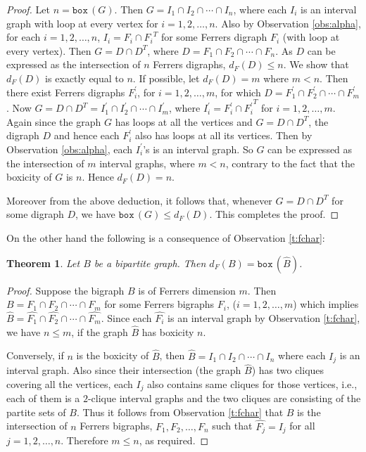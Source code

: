 \documentclass[11pt]{article}
\newtheorem{thm}{Theorem}[section]
\theoremstyle{definition}
\theoremstyle{remark}
\numberwithin{equation}{section}
\newcommand{\BOX}[1]{\texttt{box}\,(#1)}
\begin{document}
\begin{proof}Let $n=\BOX{G}$. Then $G = I_1 \cap I_2 \cap \cdots \cap I_n$, where each $I_i$ is an interval graph with loop at every vertex for $i = 1, 2, \ldots , n$. Also by Observation \ref{obs:alpha}, for each $i = 1, 2, \ldots, n$, $I_i = F_i \cap {F_i}^T$ for some Ferrers digraph $F_i$ (with loop at every vertex). Then $G=D\cap D^T$, where $D = F_1 \cap F_2 \cap \cdots \cap F_n$. As $D$ can be expressed as the intersection of $n$ Ferrers digraphs, $d_F(D) \leq n$. We show that $d_F(D)$ is exactly equal to $n$. If possible, let $d_F(D) = m$ where $m < n$. Then there exist Ferrers digraphs $F^\prime_i$, for $i = 1, 2, \ldots , m$, for which $D = F^\prime_1 \cap F^\prime_2 \cap \cdots \cap F^\prime_m$. Now $G=D \cap D^T={I^\prime_1} \cap {I^\prime_2} \cap \cdots \cap {I^\prime_m}$, where $I^\prime_i = {F^\prime_i} \cap {{F^\prime_i}^T}$ for $i = 1, 2, \ldots , m$. Again since the graph $G$ has loops at all the vertices and $G=D\cap D^T$, the digraph $D$ and hence each $F_i^\prime$ also has loops at all its vertices. Then by Observation \ref{obs:alpha}, each $I^\prime_i$'s is an interval graph. So $G$ can be expressed as the intersection of $m$ interval graphs, where $m < n$, contrary to the fact that the boxicity of $G$ is $n$. Hence $d_F(D) = n$.

\vspace{1em} Moreover from the above deduction, it follows that, whenever $G=D\cap D^T$ for some digraph $D$, we have $\BOX{G}\leqslant d_F(D)$. This completes the proof.
\end{proof}

On the other hand the following is a consequence of Observation \ref{t:fchar}:

\begin{thm}
Let $B$ be a bipartite graph. Then $d_F(B)=\BOX{\widehat{B}}$.
\end{thm}

\begin{proof}
Suppose the bigraph $B$ is of Ferrers dimension $m$. Then $B=F_1\cap F_2\cap\cdots \cap F_m$ for some Ferrers bigraphs $F_i$, {\small ($i=1,2,\ldots ,m$)} which implies $\widehat{B}=\widehat{F_1}\cap \widehat{F_2}\cap\cdots \cap \widehat{F_m}$. Since each $\widehat{F_i}$ is an interval graph by Observation \ref{t:fchar}, we have $n\leqslant m$, if the graph $\widehat{B}$ has boxicity $n$. 

\vspace{1em} Conversely, if $n$ is the boxicity of $\widehat{B}$, then $\widehat{B}=I_1\cap I_2\cap\cdots\cap I_n$ where each $I_j$ is an interval graph. Also since their intersection (the graph $\widehat{B}$) has two cliques covering all the vertices, each $I_j$ also contains same cliques for those vertices, i.e., each of them is a $2$-clique interval graphs and the two cliques are consisting of the partite sets of $B$. Thus it follows from Observation \ref{t:fchar} that $B$ is the intersection of $n$ Ferrers bigraphs, $F_1,F_2,\ldots ,F_n$ such that $\widehat{F_j}=I_j$ for all $j=1,2,\ldots ,n$. Therefore $m\leqslant n$, as required.
\end{proof}
\end{document}
